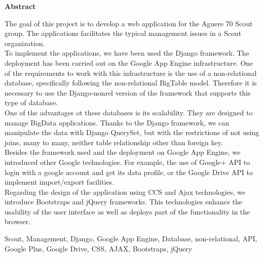 \documentclass[spanish,a4paper,11pt,twoside]{report}
\newenvironment{summary}
{\par\noindent\begin{center}\textbf{Abstract}\end{center}\begin{itshape}\par\noindent}
{\end{itshape}}
\newenvironment{keywords}
{\begin{list}{}{\setlength{\leftmargin}{1em}}\item[\hskip\labelsep \bfseries Keywords:]}
{\end{list}}
\begin{document}
\cleardoublepage
\begin{summary}
{\em 

The goal of this project is to develop a web application for the Aguere 70 Scout group. The applications facilitates the typical management issues in a Scout organization.\\

To implement the applications, we have been used the Django framework. The deployment has been carried out on the Google App Engine infrastructure.
One of the requirements to work with this infrastructure is the use of a non-relational database, specifically following the non-relational BigTable model.
Therefore it is necessary to use the Django-nonrel version of the framework that supports this type of database.\\

One of the advantages ot these databases is its scalability. They are designed to manage BigData applications. 
Thanks to the Django framework, we can
manipulate the data with Django QuerySet, but with the restrictions of not using joins, many to many, neither table relationship other than foreign key.\\

Besides the framework used and the deployment on Google App Engine, we introduced other Google technologies. For example, the use of Google+ API to login with a google account and get its data profile, or the Google Drive API to implement import/export facilities.\\

Regarding the design of the application using CCS and Ajax technologies, we introduce Bootstraps and jQuery frameworks. This technologies enhance the usability of the user interface as well as deploys 
part of the functionality in the browser.\\



}

\begin{keywords}
Scout, Management, Django, Google App Engine, Database, non-relational, API, Google Plus, Google Drive, CSS, AJAX, Bootstraps, jQuery
\end{keywords}

\end{summary}

\newpage{\pagestyle{empty}\cleardoublepage}
\thispagestyle{empty}
\end{document}
